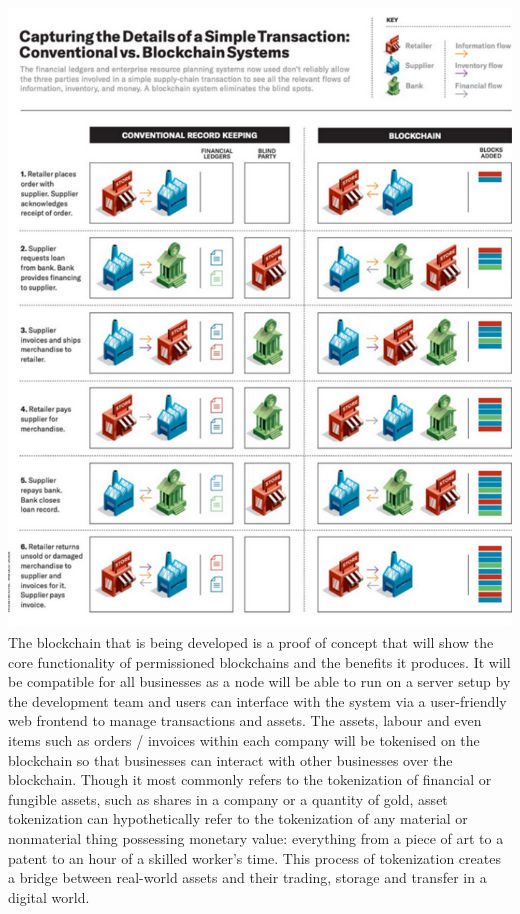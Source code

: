 \includegraphics[width=\linewidth]{figures/vs.png} \\

The blockchain that is being developed is a proof of concept that will show the core functionality of permissioned blockchains and the benefits it produces. It will be compatible for all businesses as a node will be able to run on a server setup by the development team and users can interface with the system via a user-friendly web frontend to manage transactions and assets. The assets, labour and even items such as orders / invoices within each company will be tokenised on the blockchain so that businesses can interact with other businesses over the blockchain. Though it most commonly refers to the tokenization of financial or fungible assets, such as shares in a company or a quantity of gold, asset tokenization can hypothetically refer to the tokenization of any material or nonmaterial thing possessing monetary value: everything from a piece of art to a patent to an hour of a skilled worker’s time. This process of tokenization creates a bridge between real-world assets and their trading, storage and transfer in a digital world.\\

